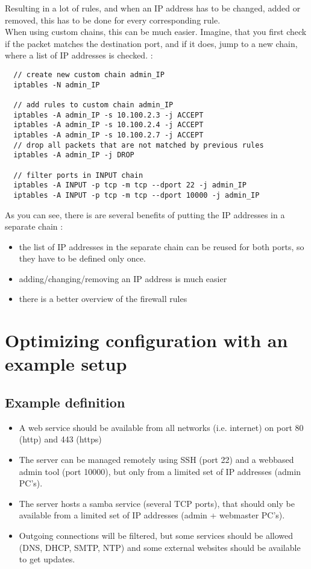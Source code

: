\documentclass[a4paper,12pt]{article}
\begin{document}
Resulting in a lot of rules, and when an IP address has to be changed, added or removed, this has to be done for every corresponding rule.\\

When using custom chains, this can be much easier. Imagine, that you first check if the packet matches the destination port, and if it does, jump to a new chain, where a list of IP addresses is checked. :
\begin{verbatim}
  // create new custom chain admin_IP
  iptables -N admin_IP

  // add rules to custom chain admin_IP
  iptables -A admin_IP -s 10.100.2.3 -j ACCEPT
  iptables -A admin_IP -s 10.100.2.4 -j ACCEPT
  iptables -A admin_IP -s 10.100.2.7 -j ACCEPT
  // drop all packets that are not matched by previous rules
  iptables -A admin_IP -j DROP

  // filter ports in INPUT chain
  iptables -A INPUT -p tcp -m tcp --dport 22 -j admin_IP
  iptables -A INPUT -p tcp -m tcp --dport 10000 -j admin_IP
\end{verbatim}

As you can see, there is are several benefits of putting the IP addresses in a separate chain :
\begin{itemize}
    \item the list of IP addresses in the separate chain can be reused for both ports, so they have to be defined only once.
    \item adding/changing/removing an IP address is much easier
    \item there is a better overview of the firewall rules
\end{itemize}

\section{Optimizing configuration with an example setup}
\subsection{Example definition}
\begin{itemize}
  \item A web service should be available from all networks (i.e. internet) on port 80 (http) and 443 (https)
  \item The server can be managed remotely using SSH (port 22) and a webbased admin tool (port 10000), but only from a limited set of IP addresses (admin PC's).
  \item The server hosts a samba service (several TCP ports), that should only be available from a limited set of IP addresses (admin + webmaster PC's).
  \item Outgoing connections will be filtered, but some services should be allowed (DNS, DHCP, SMTP, NTP) and some external websites should be available to get updates.
\end{itemize}
\end{document}
